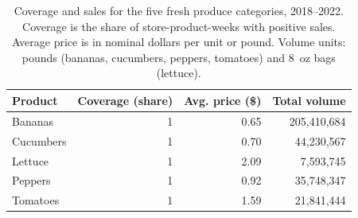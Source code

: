 \begin{table}[!h]
\centering
\caption{\label{tab:tab:product_coverage}Coverage and sales for the five fresh produce categories, 2018--2022. Coverage is the share of store-product-weeks with positive sales. Average price is in nominal dollars per unit or pound. Volume units: pounds (bananas, cucumbers, peppers, tomatoes) and 8~oz bags (lettuce).}
\centering
\begin{tabular}[t]{lrrr}
\toprule
Product & Coverage (share) & Avg. price (\$) & Total volume\\
\midrule
Bananas & 1 & 0.65 & 205,410,684\\
Cucumbers & 1 & 0.70 & 44,230,567\\
Lettuce & 1 & 2.09 & 7,593,745\\
Peppers & 1 & 0.92 & 35,748,347\\
Tomatoes & 1 & 1.59 & 21,841,444\\
\bottomrule
\end{tabular}
\end{table}
